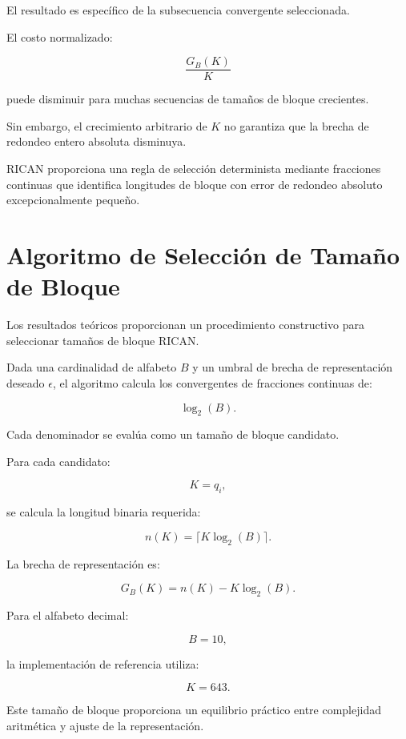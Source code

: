 \documentclass[onecolumn]{IEEEtran}
\begin{document}
\begin{remark}

El resultado es específico de la subsecuencia convergente seleccionada.

El costo normalizado:

\[
\frac{G_B(K)}{K}
\]

puede disminuir para muchas secuencias de tamaños de bloque
crecientes.

Sin embargo, el crecimiento arbitrario de $K$ no garantiza que la
brecha de redondeo entero absoluta disminuya.

RICAN proporciona una regla de selección determinista mediante
fracciones continuas que identifica longitudes de bloque con error de
redondeo absoluto excepcionalmente pequeño.

\end{remark}


\section{Algoritmo de Selección de Tamaño de Bloque}

Los resultados teóricos proporcionan un procedimiento constructivo
para seleccionar tamaños de bloque RICAN.

Dada una cardinalidad de alfabeto $B$ y un umbral de brecha de
representación deseado $\epsilon$, el algoritmo calcula los
convergentes de fracciones continuas de:

\[
\log_2(B).
\]

Cada denominador se evalúa como un tamaño de bloque candidato.

Para cada candidato:

\[
K=q_i,
\]

se calcula la longitud binaria requerida:

\[
n(K)=\lceil K\log_2(B)\rceil .
\]

La brecha de representación es:

\[
G_B(K)
=
n(K)-K\log_2(B).
\]

Para el alfabeto decimal:

\[
B=10,
\]

la implementación de referencia utiliza:

\[
K=643 .
\]

Este tamaño de bloque proporciona un equilibrio práctico entre
complejidad aritmética y ajuste de la representación.
\end{document}
